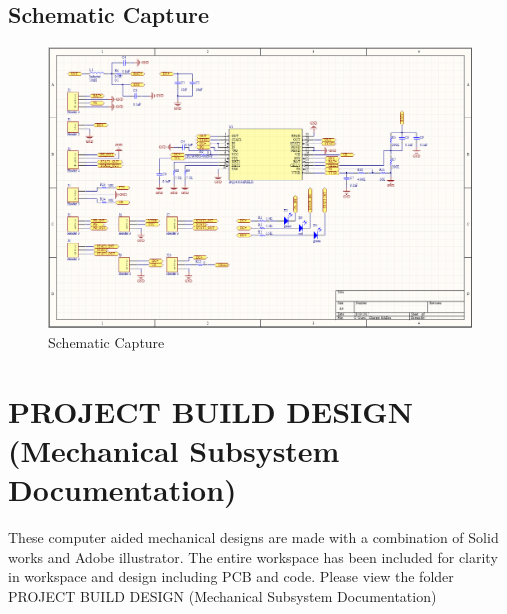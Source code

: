 \documentclass[a4paper, 10pt]{IEEEconf}
\begin{document}
\subsection{Schematic Capture}
\begin{figure}[H]
  \includegraphics[width=\linewidth, center]{images/SchematicCapture}
  \caption{Schematic Capture}
  \label{fig:Schematic Capture}
\end{figure}

\clearpage
\section{PROJECT BUILD DESIGN (Mechanical Subsystem Documentation)}
These computer aided mechanical designs are made with a combination of Solid works and Adobe illustrator. The entire workspace has been included for clarity in workspace and design including PCB and code. Please view the folder PROJECT BUILD DESIGN (Mechanical Subsystem Documentation)

\end{document}
